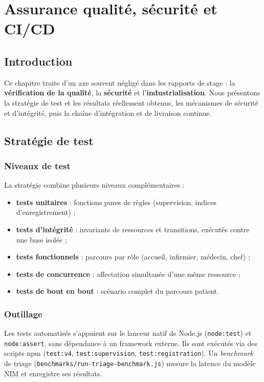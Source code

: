\chapter{Assurance qualité, sécurité et CI/CD}

\section{Introduction}

Ce chapitre traite d'un axe souvent négligé dans les rapports de stage : la \textbf{vérification de la qualité}, la \textbf{sécurité} et l'\textbf{industrialisation}. Nous présentons la stratégie de test et les résultats réellement obtenus, les mécanismes de sécurité et d'intégrité, puis la chaîne d'intégration et de livraison continue.

\section{Stratégie de test}

\subsection{Niveaux de test}

La stratégie combine plusieurs niveaux complémentaires :

\begin{itemize}
    \item \textbf{tests unitaires} : fonctions pures de règles (supervision, indices d'enregistrement) ;
    \item \textbf{tests d'intégrité} : invariants de ressources et transitions, exécutés contre une base isolée ;
    \item \textbf{tests fonctionnels} : parcours par rôle (accueil, infirmier, médecin, chef) ;
    \item \textbf{tests de concurrence} : affectation simultanée d'une même ressource ;
    \item \textbf{tests de bout en bout} : scénario complet du parcours patient.
\end{itemize}

\subsection{Outillage}

Les tests automatisés s'appuient sur le lanceur natif de Node.js (\texttt{node:test}) et \texttt{node:assert}, sans dépendance à un framework externe. Ils sont exécutés via des scripts npm (\texttt{test:v4}, \texttt{test:supervision}, \texttt{test:registration}). Un \textit{benchmark} de triage (\texttt{benchmarks/run-triage-benchmark.js}) mesure la latence du modèle NIM et enregistre ses résultats.

